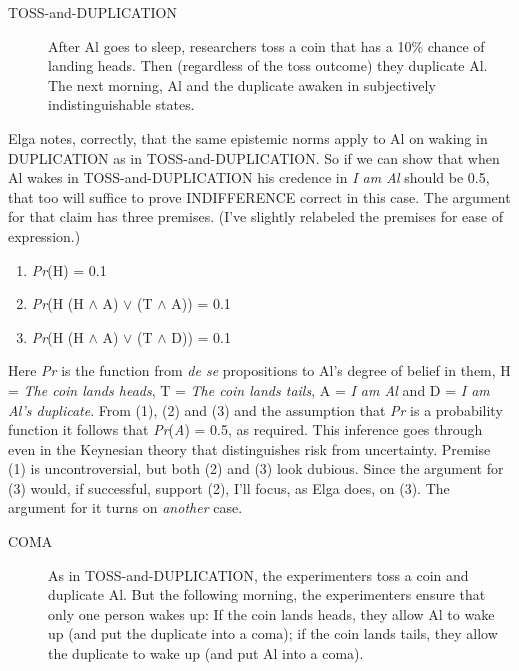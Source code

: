\begin{description}
\item [TOSS-and-DUPLICATION] After Al goes to sleep, researchers toss a coin that has a 10\% chance of landing heads. Then (regardless of the toss outcome) they duplicate Al. The next morning, Al and the duplicate awaken in subjectively indistinguishable states.
\end{description}

\noindent Elga notes, correctly, that the same epistemic norms apply to Al on waking in DUPLICATION as in TOSS-and-DUPLICATION. So if we can show that when Al wakes in TOSS-and-DUPLICATION his credence in \textit{I am Al} should be 0.5, that too will suffice to prove INDIFFERENCE correct in this case. The argument for that claim has three premises. (I've slightly relabeled the premises for ease of expression.)

\begin{enumerate}
\renewcommand{\labelenumi}{(\arabic{enumi})}
\item \textit{Pr}(H) = 0.1
\item \textit{Pr}(H {\textbar} (H ${\wedge}$ A) ${\vee}$ (T ${\wedge}$ A)) = 0.1
\item \textit{Pr}(H {\textbar} (H ${\wedge}$ A) ${\vee}$ (T ${\wedge}$ D)) = 0.1
\end{enumerate}

\noindent Here \textit{Pr} is the function from \textit{de se} propositions to Al's degree of belief in them, H = \textit{The coin lands heads}, T = \textit{The coin lands tails},\textit{ }A = \textit{I am Al} and D = \textit{I am Al's duplicate}. From (1), (2) and (3) and the assumption that \textit{Pr} is a probability function it follows that \textit{Pr}(\textit{A}) = 0.5, as required. This inference goes through even in the Keynesian theory that distinguishes risk from uncertainty. Premise (1) is uncontroversial, but both (2) and (3) look dubious. Since the argument for (3) would, if successful, support (2), I'll focus, as Elga does, on (3). The argument for it turns on \textit{another} case.

\begin{description}
\item[COMA] As in TOSS-and-DUPLICATION, the experimenters toss a coin and duplicate Al. But the following morning, the experimenters ensure that only one person wakes up: If the coin lands heads, they allow Al to wake up (and put the duplicate into a coma); if the coin lands tails, they allow the duplicate to wake up (and put Al into a coma).
\end{description}

